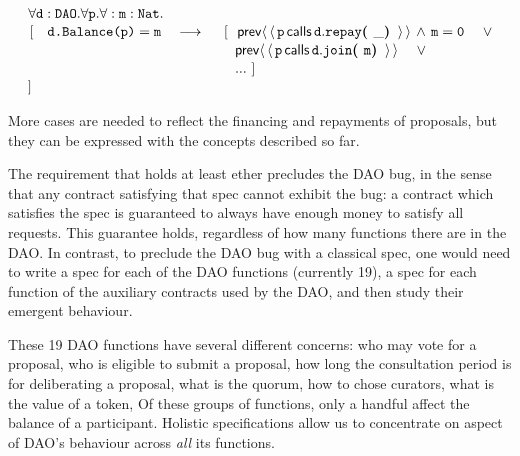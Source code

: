 \noindent
$\strut \hspace{0.5cm} \forall {\mbox{\tt{d}}}:{\mbox{\tt{DAO}}}.\forall {\mbox{\tt{p}}}.\forall:{\mbox{\tt{m}}}:{\mbox{\tt{Nat}}}.$\\
$\strut \hspace{0.5cm} [ \ \ \  \prg{d.Balance(p)}=\prg{m} \ \ \  \longrightarrow   
 \ \  \ \ 
  [ \  \ \Prev{\Calls{\prg{p}}{\prg{repay}}{\prg{d}}{\_}}\, \wedge\, \prg{m}=\prg{0} \ \ \ \ \vee $\\
$\strut \hspace{5.7cm}      
\Prev{\Calls{\prg{p}}{\prg{join}}{\prg{d}}{\prg{m}}}  \ \ \ \ \vee   $\\
 $\strut \hspace{5.7cm}  ... \  ]$ \\
%                         
$\strut \hspace{0.5cm} ] $


More cases are needed to reflect the financing and repayments of proposals, but they can be expressed with the concepts described so far.


 

The requirement that  holds at least  ether precludes the DAO bug,
in the sense that  any contract satisfying that spec cannot exhibit  the  bug:   a contract
which satisfies the spec  is guaranteed to always have enough money to satisfy all  requests.
This guarantee  holds, regardless of how many functions there are in the DAO.
In contrast, to preclude the DAO  bug with a classical spec, one would need to write a spec for each of the
DAO functions (currently 19), a spec for each function of the auxiliary contracts used by the DAO,
and then study their emergent  behaviour.

These 19 DAO functions   have several different concerns:
who may vote   for a proposal, who is eligible to submit a proposal,
how long the consultation period is for deliberating a proposal, what
is the quorum, how to chose curators, what is the value of a token,
Of these groups of functions, only  a handful affect the balance of a
participant. Holistic specifications allow us to concentrate on aspect of DAO's behaviour across \emph{all} its functions.
 
